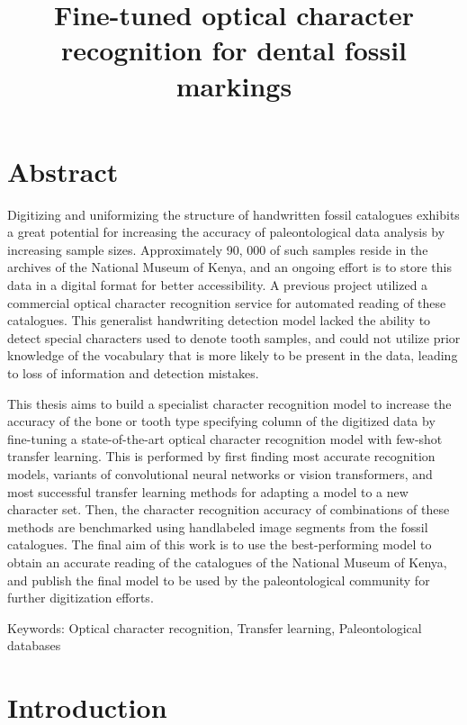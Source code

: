 \documentclass{article}
\title{Fine-tuned optical character recognition for dental fossil markings}
\begin{document}
\tableofcontents

\section{Abstract}

Digitizing and uniformizing the structure of handwritten fossil catalogues exhibits a great 
potential for increasing the accuracy of paleontological data analysis by increasing sample sizes. 
Approximately 90, 000 of such samples reside in the archives of the National Museum of Kenya, and 
an ongoing effort is to store this data in a digital format for better accessibility.
A previous project utilized a commercial optical character recognition service for automated reading of these catalogues. This generalist
handwriting detection model lacked the ability to detect special characters used to denote tooth samples, and could not utilize prior knowledge 
of the vocabulary that is more likely to be present in the data, leading to loss of information and detection mistakes.

This thesis aims to build a specialist character recognition model to increase the accuracy of 
the bone or tooth type specifying column of the digitized data by fine-tuning a state-of-the-art optical 
character recognition model with few-shot transfer learning. This is performed by first finding most accurate
recognition models, variants of convolutional neural networks or vision transformers, and most successful 
transfer learning methods for adapting a model to a new character set. Then, the character 
recognition accuracy of combinations of these methods are benchmarked using handlabeled image segments from the 
fossil catalogues. The final aim of this work is to use the best-performing model 
to obtain an accurate reading of the catalogues of the National Museum of Kenya, and publish the final model to be used 
by the paleontological community for further digitization efforts.

Keywords: Optical character recognition, Transfer learning, Paleontological databases

\section{Introduction}



\end{document}
